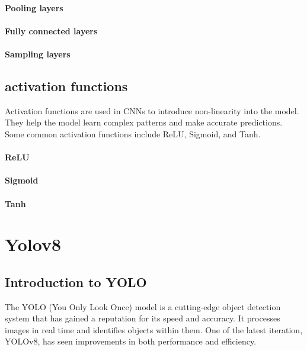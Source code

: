 \documentclass[11pt,a4paper,oneside]{report}
\begin{document}
\label{par:convolutional-layers}


\paragraph{Pooling layers}\label{par:pooling-layers}


\paragraph{Fully connected layers}\label{par:fully-connected-layers}


\paragraph{Sampling layers}\label{par:sampling-layers}

\subsection{activation functions}\label{subsec:activation-functions}
Activation functions are used in CNNs to introduce non-linearity into the model.
They help the model learn complex patterns and make accurate predictions.
Some common activation functions include ReLU, Sigmoid, and Tanh.

\paragraph{ReLU}\label{par:relu}


\paragraph{Sigmoid}\label{par:sigmoid}


\paragraph{Tanh}\label{par:tanh}


\section{Yolov8}\label{sec:yolov8}

\subsection{Introduction to YOLO}\label{subsec:introduction-to-yolo}
The YOLO (You Only Look Once) model is a cutting-edge object detection system that has gained a reputation for
its speed and accuracy.
It processes images in real time and identifies objects within them.
One of the latest iteration, YOLOv8, has seen improvements in both performance and efficiency.
\end{document}
